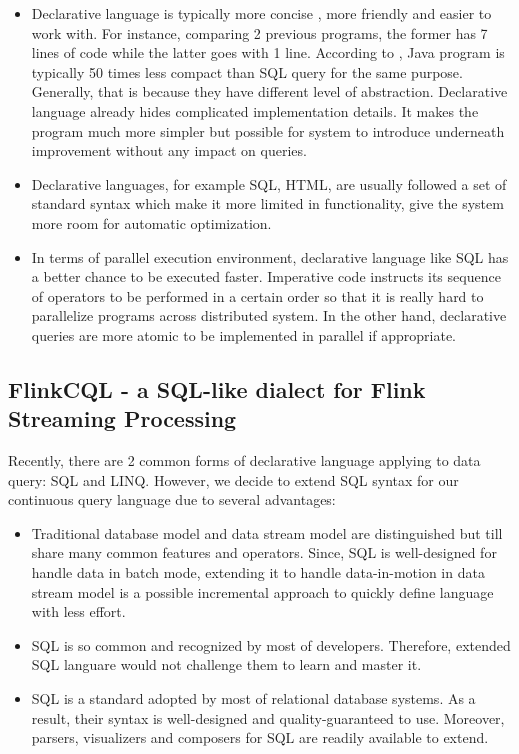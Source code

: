 \begin{itemize}
	\item Declarative language is typically more concise , more friendly and easier to work with. For instance, comparing 2 previous programs, the former has 7 lines of code while the latter goes with 1 line. According to \citep{Ronnie:2015}, Java program is typically 50 times less compact than SQL query for the same purpose. Generally, that is because they have different level of abstraction. Declarative language already hides complicated implementation details. It makes the program much more simpler but possible for system to introduce underneath improvement without any impact on queries.
	\item Declarative languages, for example SQL, HTML,  are usually followed a set of standard syntax which make it more limited in functionality, give the system more room for automatic optimization. 
	\item In terms of parallel execution environment, declarative language like SQL has a better chance to be executed faster. Imperative code instructs its sequence of operators to be performed in a certain order so that it is really hard to parallelize programs across distributed system. In the other hand, declarative queries are more atomic to be implemented in parallel if appropriate.
\end{itemize}

\subsection*{FlinkCQL - a SQL-like dialect for Flink Streaming Processing}
Recently, there are 2 common forms of declarative language applying to data query: SQL and LINQ. However, we decide to extend SQL syntax for our continuous query language due to several advantages:
\begin{itemize}
	\item Traditional database model and data stream model are distinguished but till share many common features and operators. Since, SQL is well-designed for handle data in batch mode, extending it to handle data-in-motion in data stream model is a possible incremental approach to quickly define language with less effort.
	\item SQL is so common and recognized by most of developers. Therefore, extended SQL languare would not challenge them to learn and master it.
	\item SQL is a standard adopted by most of relational database systems. As a result, their syntax is well-designed and quality-guaranteed to use. Moreover, parsers, visualizers and composers for SQL are readily available to extend.
\end{itemize}

